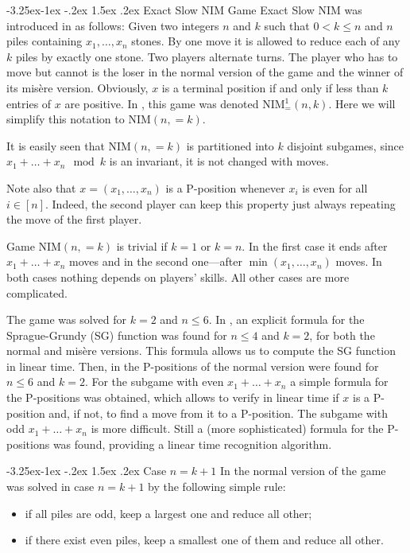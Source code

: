 \documentclass[10pt]{article}
\makeatletter
\renewcommand\subsection{\@startsection{subsection}{2}{\z@}
{-3.25ex\@plus -1ex \@minus -.2ex}
{1.5ex \@plus .2ex}
{\normalfont\normalsize\bfseries\boldmath}}
\theoremstyle{definition}
\makeatother
\begin{document}
\subsection{Exact Slow NIM} 
\label{ss00}
Game Exact Slow NIM  
was introduced in \cite{GH15} as follows: 
Given two integers  $n$ and $k$  
such that  $0 < k \leq n$  and  
$n$  piles containing  $x_1, \ldots, x_n$  stones.  
By one move it is allowed to reduce each of any  $k$  piles 
by exactly one stone. 
Two players alternate turns. 
The player who has to move but cannot is the loser 
in the normal version of the game and 
the winner of its mis\`ere version. 
Obviously, $x$ is a terminal position 
if and only if less than $k$ entries of $x$ are positive. 
In \cite{GH15}, this game was denoted  NIM$^1_=(n,k)$.
Here we will simplify this notation to  NIM$(n,=k)$.

It is easily seen that  NIM$(n,=k)$  
is partitioned into  $k$  disjoint subgames, 
since $x_1 + \ldots + x_n \mod k$  is an invariant, 
it is not changed with moves. 

Note also that $x = (x_1, \ldots, x_n)$ 
is a P-position whenever  $x_i$  is even for all $i \in [n]$. 
Indeed, the second player can keep this property 
just always repeating the move of the first player. 

Game NIM$(n,=k)$  is trivial if  $k = 1$  or  $k = n$. 
In the first case it ends after $x_1 + \ldots + x_n$ moves  
and in the second one---after  $\min(x_1, \ldots, x_n)$ 
moves. In both cases nothing depends on players' skills. 
All other cases are more complicated. 

The game was solved for  $k=2$  and  $n \leq 6$.
In \cite{GHHC20}, an explicit formula 
for the Sprague-Grundy 
(SG) function was found for  $n \leq 4$ and $k = 2$, 
for both the normal and mis\`ere versions. 
This formula allows us to compute the SG function in linear time. 
Then, in \cite{CGKPV21} the P-positions 
of the normal version were found for  $n \leq 6$ and $k = 2$.  
For the subgame with even  $x_1 + \ldots + x_n$ 
a simple formula for the P-positions was obtained, 
which allows to verify in linear time 
if  $x$ is a P-position and, if not, 
to find a move from it to a P-position.  
The subgame with odd  $x_1 + \ldots + x_n$ is more difficult. 
Still a (more sophisticated)  formula 
for the P-positions was found,  
providing a linear time recognition algorithm.

\subsection{Case $n = k+1$}
\label{ss01}
In \cite{GMMV23} the normal version of the game  
was solved in case $n = k+1$ 
by the following simple rule: 
\begin{itemize}
\item[(o)] if all piles are odd, 
keep a largest one and reduce all other;
\item[(e)] if there exist even piles, 
keep a smallest one of them and reduce all other.
\end{itemize}
\end{document}
